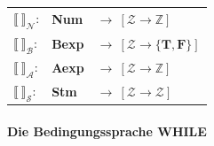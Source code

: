\documentclass[
  a4paper,
  11pt,
]{scrartcl}
\newcommand{\Z}{\mathbb{Z}}
\newcommand{\Ac}{\mathcal{A}}
\newcommand{\Bc}{\mathcal{B}}
\newcommand{\Nc}{\mathcal{N}}
\newcommand{\Sc}{\mathcal{S}}
\newcommand{\Zc}{\mathcal{Z}}
\begin{document}
\begin{itemize}
\begin{center}
\begin{tabular}{lll}
        $\llbracket \ \rrbracket_{\Nc}$:
        & \textbf{Num}
        & $\rightarrow \ \left[ \Zc \rightarrow \Z \right]$\\
        $\llbracket \ \rrbracket_{\Bc}$:
        & \textbf{Bexp}
        & $\rightarrow \ \left[ \Zc \rightarrow \{ \textbf{T}, \textbf{F} \} \right]$\\
        $\llbracket \ \rrbracket_{\Ac}$:
        & \textbf{Aexp}
        & $\rightarrow \ \left[ \Zc \rightarrow \Z \right]$\\
        $\llbracket \ \rrbracket_{\Sc}$:
        & \textbf{Stm}
        & $\rightarrow \ \left[ \Zc \rightarrow \Zc \right]$\\
      \end{tabular}
    \end{center}
\end{itemize}

\paragraph{Die Bedingungssprache WHILE}
\label{par:die_bedingungssprache_while}
\end{document}

